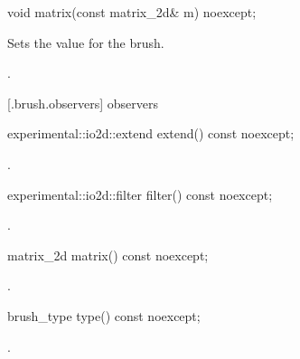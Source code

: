 \begin{itemdecl}
    void matrix(const matrix_2d& m) noexcept;
\end{itemdecl}
\begin{itemdescr}
	\pnum
	\effects
	Sets the  value for the brush.
	
	\pnum
	\postconditions
	.
	
\end{itemdescr}

 [\iotwod.brush.observers]{ observers}

\begin{itemdecl}
    experimental::io2d::extend extend() const noexcept;
\end{itemdecl}
\begin{itemdescr}
	\pnum
	\returns
	.

\end{itemdescr}

\begin{itemdecl}
    experimental::io2d::filter filter() const noexcept;
\end{itemdecl}
\begin{itemdescr}
	\pnum
	\returns
	.

\end{itemdescr}

\begin{itemdecl}
    matrix_2d matrix() const noexcept;
\end{itemdecl}
\begin{itemdescr}
	\pnum
	\returns
	.

\end{itemdescr}

\begin{itemdecl}
    brush_type type() const noexcept;
\end{itemdecl}
\begin{itemdescr}
	\pnum
	\returns
	.

\end{itemdescr}
